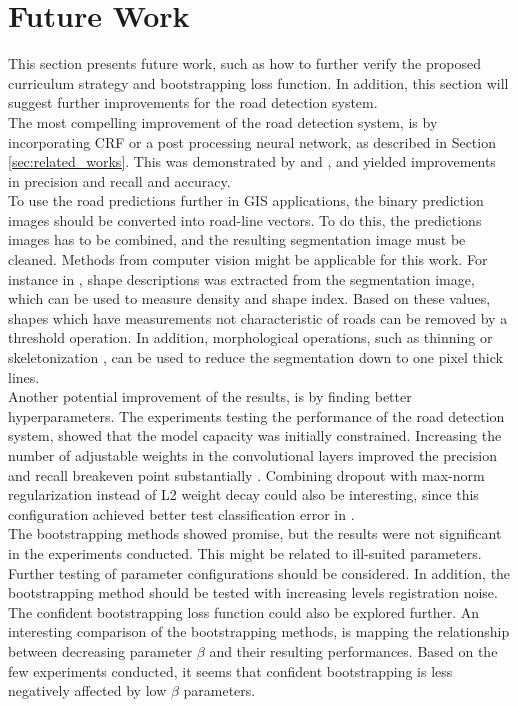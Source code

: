 \section{Future Work}
\label{sec:futureWork}
This section presents future work, such as how to further verify the proposed curriculum strategy and bootstrapping loss function. In addition, this section will suggest further improvements for the road detection system.\\

The most compelling improvement of the road detection system, is by incorporating \ac{CRF} or a post processing neural network, as described in Section \ref{sec:related_works}. This was demonstrated by \cite{Kluckner_semantic_height} and \cite{Mnih_aerial_images_noisy} , and yielded improvements in precision and recall and accuracy. \\

To use the road predictions further in GIS applications, the binary prediction images should be converted into road-line vectors. To do this, the predictions images has to be combined, and the resulting segmentation image must be cleaned. Methods from computer vision might be applicable for this work. For instance in \citep{Song_road_extraction_svm}, shape descriptions was extracted from the segmentation image, which can be used to measure density and shape index. Based on these values, shapes which have measurements not characteristic of roads can be removed by a threshold operation. In addition, morphological operations, such as thinning or skeletonization , can be used to reduce the segmentation down to one pixel thick lines.\\

Another potential improvement of the results, is by finding better hyperparameters. The experiments testing the performance of the road detection system, showed that the model capacity was initially constrained. Increasing the number of adjustable weights in the convolutional layers improved the precision and recall breakeven point substantially . Combining dropout with max-norm regularization instead of L2 weight decay could also be interesting, since this configuration achieved better test classification error in \citep{Srivastava_dropout}.\\

The bootstrapping methods showed promise, but the results were not significant in the experiments conducted. This might be related to ill-suited parameters. Further testing of parameter configurations should be considered. In addition, the bootstrapping method should be tested with increasing levels registration noise. The confident bootstrapping loss function could also be explored further. An interesting comparison of the bootstrapping methods, is mapping the relationship between decreasing parameter $\beta$ and their resulting performances. Based on the few experiments conducted, it seems that confident bootstrapping is less negatively affected by low $\beta$ parameters.\\


